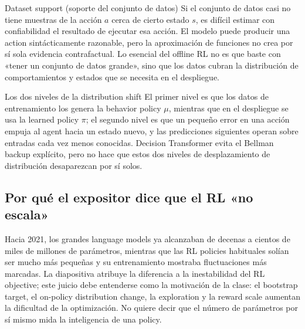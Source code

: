 \begin{importantbox}{Dataset support (soporte del conjunto de datos)}
Si el conjunto de datos casi no tiene muestras de la acción $a$ cerca de cierto estado $s$, es difícil estimar con confiabilidad el resultado de ejecutar esa acción. El modelo puede producir una action sintácticamente razonable, pero la aproximación de funciones no crea por sí sola evidencia contrafactual. Lo esencial del offline RL no es que baste con «tener un conjunto de datos grande», sino que los datos cubran la distribución de comportamientos y estados que se necesita en el despliegue.
\end{importantbox}

\begin{warningbox}{Los dos niveles de la distribution shift}
El primer nivel es que los datos de entrenamiento los genera la behavior policy $\mu$, mientras que en el despliegue se usa la learned policy $\pi$; el segundo nivel es que un pequeño error en una acción empuja al agent hacia un estado nuevo, y las predicciones siguientes operan sobre entradas cada vez menos conocidas. Decision Transformer evita el Bellman backup explícito, pero no hace que estos dos niveles de desplazamiento de distribución desaparezcan por sí solos.
\end{warningbox}

\subsection{Por qué el expositor dice que el RL «no escala»}

Hacia 2021, los grandes language models ya alcanzaban de decenas a cientos de miles de millones de parámetros, mientras que las RL policies habituales solían ser mucho más pequeñas y su entrenamiento mostraba fluctuaciones más marcadas. La diapositiva atribuye la diferencia a la inestabilidad del RL objective; este juicio debe entenderse como la motivación de la clase: el bootstrap target, el on-policy distribution change, la exploration y la reward scale aumentan la dificultad de la optimización. No quiere decir que el número de parámetros por sí mismo mida la inteligencia de una policy.


